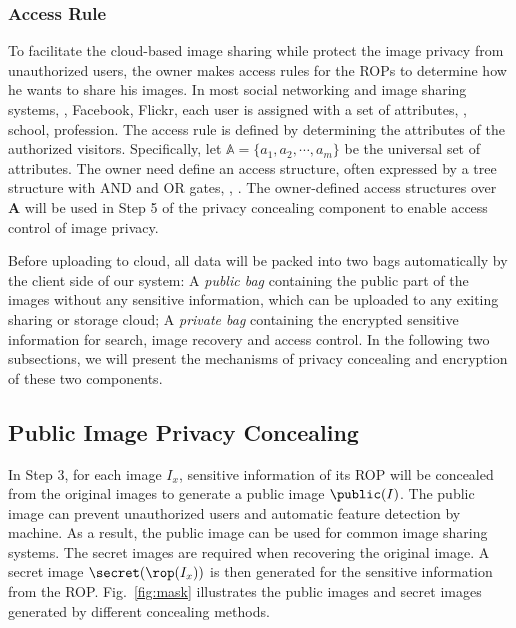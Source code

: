 {\subsubsection{Access Rule}

To facilitate the cloud-based image sharing
 while protect the image privacy from unauthorized users,
 the owner makes access rules for the ROPs to determine how he wants to share his images.
In most social networking and image sharing systems, \eg, Facebook, Flickr,
 each user is assigned with a set of attributes, \eg, school, profession.
The access rule is defined by determining the
 attributes of the authorized visitors.
Specifically, let $\mathbb{A} = \{a_1, a_2,\cdots, a_m\}$ be the universal set of attributes.
The owner need  define an access structure, often expressed by a tree structure
 with AND and OR gates, \eg, \cite{bethencourt2007ciphertext}.
The owner-defined access structures over $\mathbf{A}$ will be used in
 Step {\large{\textcircled{\small{5}}}} of the privacy concealing component
 to enable access control of image privacy.

Before uploading to cloud,
 all data will be packed into two bags automatically by the client side of our system:
A \emph{public bag} containing the public part of the images without any sensitive information,
 which can be uploaded to any exiting sharing or storage cloud;
A \emph{private bag} containing the encrypted sensitive information
 for search, image recovery and access control.
In the following two subsections,
 we will present the mechanisms of privacy concealing and encryption
 of these two components.


\subsection{Public Image Privacy Concealing}
\label{sec:concealing}

In Step {\large{\textcircled{\small{3}}}}, for each image $I_x$,
 sensitive information of its ROP
 will be concealed from the original images to generate a public image $\public(I)$.
The public image  can prevent unauthorized users
 and automatic feature detection by machine.
As a result, the public image can be used for common image sharing systems.
The secret images are required when recovering the original image.
A secret image $\secret(\rop(I_x))$ is then generated for
  the sensitive information from the ROP.
Fig.~\ref{fig:mask} illustrates the public images and secret images
 generated by different concealing methods.



}
